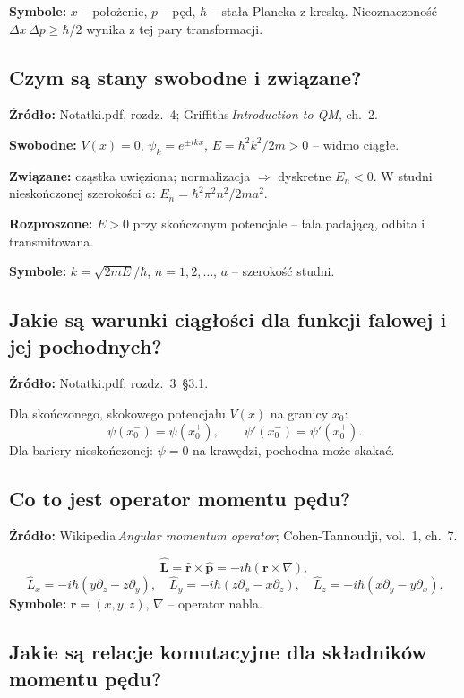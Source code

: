 		\textbf{Symbole:} $x$ – położenie, $p$ – pęd, $\hbar$ – stała Plancka z kreską.
		Nieoznaczoność $\Delta x\,\Delta p \ge \hbar/2$ wynika z tej pary transformacji.

\subsection{Czym są stany swobodne i związane?}

\textbf{Źródło:} Notatki.pdf, rozdz.~4; Griffiths\,\emph{Introduction to QM}, ch.~2.
		
		\textbf{Swobodne:} $V(x)=0$, $\psi_k=e^{\pm ikx}$, $E=\hbar^{2}k^{2}/2m>0$ – widmo ciągłe.
		
		\textbf{Związane:} cząstka uwięziona; normalizacja $\Rightarrow$ dyskretne $E_n<0$.
		W studni nieskończonej szerokości $a$: $E_n=\hbar^{2}\pi^{2}n^{2}/2ma^{2}$.
		
		\textbf{Rozproszone:} $E>0$ przy skończonym potencjale – fala padającą, odbita i transmitowana.
		
		\textbf{Symbole:} $k=\sqrt{2mE}/\hbar$, $n=1,2,\dots$, $a$ – szerokość studni.

\subsection{Jakie są warunki ciągłości dla funkcji falowej i jej pochodnych?}

\textbf{Źródło:} Notatki.pdf, rozdz.~3~\S3.1.
		
		Dla skończonego, skokowego potencjału $V(x)$ na granicy $x_0$:
		\[
		\psi(x_0^-) = \psi(x_0^+),\qquad
		\psi'(x_0^-) = \psi'(x_0^+).
		\]
		Dla bariery nieskończonej: $\psi=0$ na krawędzi, pochodna może skakać.

\subsection{Co to jest operator momentu pędu?}

\textbf{Źródło:} Wikipedia\,\emph{Angular momentum operator}; Cohen-Tannoudji, vol.~1, ch.~7.
		
		\[
		\hat{\mathbf L}=\hat{\mathbf r}\times\hat{\mathbf p}=-i\hbar(\mathbf r\times\nabla),
		\]
		\[
		\hat L_x=-i\hbar(y\partial_z-z\partial_y),\quad
		\hat L_y=-i\hbar(z\partial_x-x\partial_z),\quad
		\hat L_z=-i\hbar(x\partial_y-y\partial_x).
		\]
		\textbf{Symbole:} $\mathbf r=(x,y,z)$, $\nabla$ – operator nabla.

\subsection{Jakie są relacje komutacyjne dla składników momentu pędu?}

